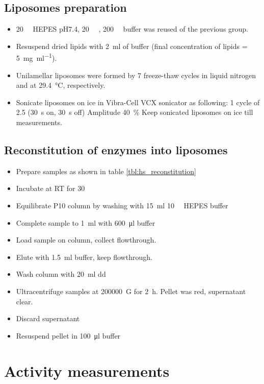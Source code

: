 \subsection{Liposomes preparation}

\begin{itemize}
	\item \SI{20}{\milli\Molar} HEPES pH7.4, \SI{20}{\milli\Molar}
		, \SI{200}{\milli\Molar}  buffer was reused of
		the previous group.
	\item Resuspend dried lipids with \SI{2}{\ml} of buffer (final
		concentration of lipids = \SI{5}{\mg\per\ml}).
	\item Unilamellar liposomes were formed by 7 freeze-thaw cycles in
		liquid nitrogen and at \SI{29.4}{\celsius}, respectively.
	\item Sonicate liposomes on ice in Vibra-Cell VCX sonicator as
		following: 1 cycle of \SI{2.5}{\min} (\SI{30}{\s} on,
		\SI{30}{\s} off) Amplitude \SI{40}{\percent} Keep sonicated
		liposomes on ice till measurements.
\end{itemize}

\subsection{Reconstitution of enzymes into liposomes}

\begin{itemize}
	\item Prepare samples as shown in table \ref{tbl:hs_reconstitution}
	\item Incubate at RT for \SI{30}{\min}
	\item Equilibrate P10 column by washing with \SI{15}{\ml} \SI{10}{\milli\Molar} HEPES buffer
	\item Complete sample to \SI{1}{\ml} with \SI{600}{\ul} buffer
	\item Load sample on column, collect flowthrough.
	\item Elute with \SI{1.5}{\ml} buffer, keep flowthrough.
	\item Wash column with \SI{20}{\ml} dd
	\item Ultracentrifuge samples at \SI{200000}{G} for \SI{2}{\hour}. Pellet was red, supernatant clear.
	\item Discard supernatant
	\item Resuspend pellet in \SI{100}{\ul} buffer
\end{itemize}

\section{Activity measurements}

